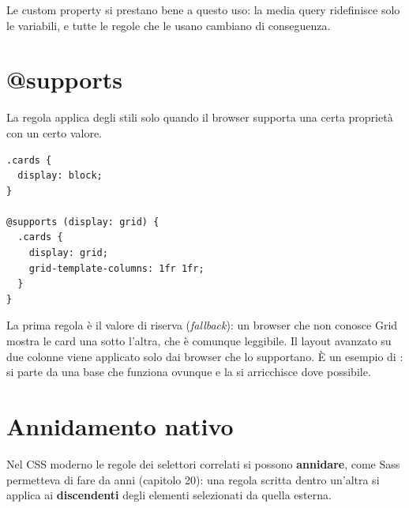Le custom property si prestano bene a questo uso: la media query ridefinisce
solo le variabili, e tutte le regole che le usano cambiano di conseguenza.

\section{@supports}

La regola  applica degli stili solo quando il browser supporta
una certa proprietà con un certo valore.

\begin{affianco}[0.46][c]
\begin{lstlisting}[style=css, name=supports.css]
.cards {
  display: block;
}

@supports (display: grid) {
  .cards {
    display: grid;
    grid-template-columns: 1fr 1fr;
  }
}
\end{lstlisting}
\risultato
\begin{immagine}
\end{immagine}
\end{affianco}

La prima regola è il valore di riserva (\textit{fallback}): un browser che non
conosce Grid mostra le card una sotto l'altra, che è comunque leggibile. Il
layout avanzato su due colonne viene applicato solo dai browser che lo
supportano. È un esempio di : si parte da una
base che funziona ovunque e la si arricchisce dove possibile.

\section{Annidamento nativo}

Nel CSS moderno le regole dei selettori correlati si possono
\textbf{annidare}, come Sass permetteva di fare da anni (capitolo 20): una
regola scritta dentro un'altra si applica ai \textbf{discendenti} degli elementi
selezionati da quella esterna.

